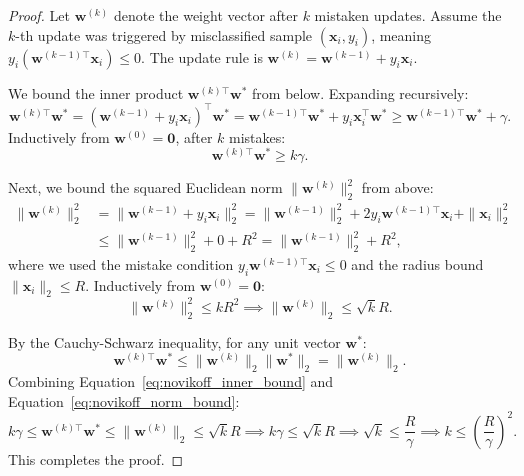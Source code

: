 \begin{proof}
Let $\mathbf{w}^{(k)}$ denote the weight vector after $k$ mistaken updates. Assume the $k$-th update was triggered by misclassified sample $(\mathbf{x}_i, y_i)$, meaning $y_i (\mathbf{w}^{(k-1)\top} \mathbf{x}_i) \le 0$. The update rule is $\mathbf{w}^{(k)} = \mathbf{w}^{(k-1)} + y_i \mathbf{x}_i$.

We bound the inner product $\mathbf{w}^{(k)\top} \mathbf{w}^*$ from below. Expanding recursively:
\begin{equation}
\mathbf{w}^{(k)\top} \mathbf{w}^* = (\mathbf{w}^{(k-1)} + y_i \mathbf{x}_i)^\top \mathbf{w}^* = \mathbf{w}^{(k-1)\top} \mathbf{w}^* + y_i \mathbf{x}_i^\top \mathbf{w}^* \ge \mathbf{w}^{(k-1)\top} \mathbf{w}^* + \gamma.
\end{equation}
Inductively from $\mathbf{w}^{(0)} = \mathbf{0}$, after $k$ mistakes:
\begin{equation}
\mathbf{w}^{(k)\top} \mathbf{w}^* \ge k \gamma.
\label{eq:novikoff_inner_bound}
\end{equation}

Next, we bound the squared Euclidean norm $\|\mathbf{w}^{(k)}\|_2^2$ from above:
\begin{align}
\|\mathbf{w}^{(k)}\|_2^2 &= \|\mathbf{w}^{(k-1)} + y_i \mathbf{x}_i\|_2^2 = \|\mathbf{w}^{(k-1)}\|_2^2 + 2 y_i \mathbf{w}^{(k-1)\top} \mathbf{x}_i + \|\mathbf{x}_i\|_2^2 \nonumber \\
&\le \|\mathbf{w}^{(k-1)}\|_2^2 + 0 + R^2 = \|\mathbf{w}^{(k-1)}\|_2^2 + R^2,
\end{align}
where we used the mistake condition $y_i \mathbf{w}^{(k-1)\top} \mathbf{x}_i \le 0$ and the radius bound $\|\mathbf{x}_i\|_2 \le R$. Inductively from $\mathbf{w}^{(0)} = \mathbf{0}$:
\begin{equation}
\|\mathbf{w}^{(k)}\|_2^2 \le k R^2 \implies \|\mathbf{w}^{(k)}\|_2 \le \sqrt{k} R.
\label{eq:novikoff_norm_bound}
\end{equation}

By the Cauchy-Schwarz inequality, for any unit vector $\mathbf{w}^*$:
\begin{equation}
\mathbf{w}^{(k)\top} \mathbf{w}^* \le \|\mathbf{w}^{(k)}\|_2 \|\mathbf{w}^*\|_2 = \|\mathbf{w}^{(k)}\|_2.
\end{equation}
Combining Equation~\eqref{eq:novikoff_inner_bound} and Equation~\eqref{eq:novikoff_norm_bound}:
\begin{equation}
k \gamma \le \mathbf{w}^{(k)\top} \mathbf{w}^* \le \|\mathbf{w}^{(k)}\|_2 \le \sqrt{k} R \implies k \gamma \le \sqrt{k} R \implies \sqrt{k} \le \frac{R}{\gamma} \implies k \le \left( \frac{R}{\gamma} \right)^2.
\end{equation}
This completes the proof.
\end{proof}

